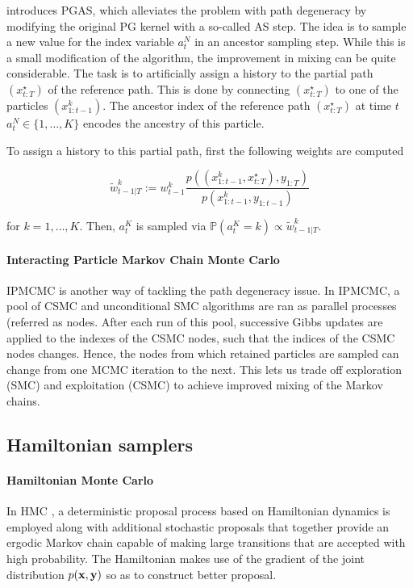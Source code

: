 \cite{Lindsten:2014uw} introduces \gls{PGAS}, which alleviates the problem with path degeneracy by modifying the original \gls{PG} kernel with a so-called \gls{AS} step.
The idea is to sample a new value for the index variable $a_t^N$ in an ancestor sampling step. While this is a small modification of the algorithm, the improvement in mixing can be quite considerable.
The task is to artificially assign a history to the partial path $(x^\star_{t:T})$ of the reference path.
This is done by connecting $(x^\star_{t:T})$ to one of the particles $(x^k_{1:t-1})$.
The ancestor index of the reference path $(x^\star_{t:T})$ at time $t$ $a^N_t \in \{1,\dots,K \}$ encodes the ancestry of this particle.

To assign a history to this partial path, first the following weights are computed

$$ \tilde{w}^k_{t-1|T} := {w}^k_{t-1} \frac{p((x^k_{1:t-1},x^\star_{t:T}), y_{1:T})}{p(x^k_{1:t-1}, y_{1:t-1    })}  $$

for $k = 1,\dots,K$. Then, $a^K_t$ is sampled via $\mathbb{P}\left( a^K_t = k \right) \propto \tilde{w}^k_{t-1|T}$.

\paragraph{Interacting Particle Markov Chain Monte Carlo}
\gls{IPMCMC} \cite{Rainforth:2016wq} is another way of tackling the path degeneracy issue.
In \gls{IPMCMC}, a pool of \gls{CSMC} and unconditional \gls{SMC} algorithms are ran as parallel processes (referred as nodes. After each run of this pool, successive Gibbs updates are applied to the indexes of the \gls{CSMC} nodes, such that the indices of the \gls{CSMC} nodes changes. Hence, the nodes from which retained particles are sampled can change from one \gls{MCMC} iteration to the next. This lets us trade off exploration (\gls{SMC}) and exploitation (\gls{CSMC}) to achieve improved mixing of the Markov chains.

\subsection{Hamiltonian samplers}

\paragraph{Hamiltonian Monte Carlo}
In \gls{HMC} \cite{HMC,Neal:2012uu}, a deterministic proposal process based on Hamiltonian dynamics is employed along with additional stochastic proposals that together provide an ergodic Markov chain capable of making large transitions that are accepted with high probability. The Hamiltonian makes use of the gradient of the joint distribution $p(\boldsymbol{\mathbf{x}}, \boldsymbol{\mathbf{y}})$ so as to construct better proposal.

